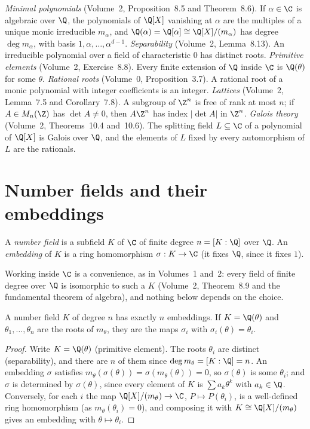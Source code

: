 \begin{reminder}
\emph{Minimal polynomials} (Volume~2, Proposition~8.5 and Theorem~8.6). If $\alpha\in\C$ is algebraic over $\Q$, the
polynomials of $\Q[X]$ vanishing at $\alpha$ are the multiples of a unique monic irreducible $m_\alpha$, and
$\Q(\alpha)=\Q[\alpha]\cong\Q[X]/(m_\alpha)$ has degree $\deg m_\alpha$, with basis $1,\alpha,\dots,\alpha^{d-1}$.
\emph{Separability} (Volume~2, Lemma~8.13). An irreducible polynomial over a field of characteristic $0$ has distinct
roots. \emph{Primitive elements} (Volume~2, Exercise~8.8). Every finite extension of $\Q$ inside $\C$ is $\Q(\theta)$
for some $\theta$. \emph{Rational roots} (Volume~0, Proposition~3.7). A rational root of a monic polynomial with
integer coefficients is an integer. \emph{Lattices} (Volume~2, Lemma~7.5 and Corollary~7.8). A subgroup of $\Z^n$ is free
of rank at most $n$; if $A\in M_n(\Z)$ has $\det A\ne0$, then $A\Z^n$ has index $|\det A|$ in $\Z^n$. \emph{Galois
theory} (Volume~2, Theorems~10.4 and~10.6). The splitting field $L\subseteq\C$ of a polynomial of $\Q[X]$ is Galois over
$\Q$, and the elements of $L$ fixed by every automorphism of $L$ are the rationals.
\end{reminder}

\section{Number fields and their embeddings}

\begin{definition}
A \emph{number field} is a subfield $K$ of $\C$ of finite degree $n=[K:\Q]$ over $\Q$. An \emph{embedding} of $K$ is
a ring homomorphism $\sigma:K\to\C$ (it fixes $\Q$, since it fixes $1$).
\end{definition}

Working inside $\C$ is a convenience, as in Volumes~1 and~2: every field of finite degree over $\Q$ is isomorphic to
such a $K$ (Volume~2, Theorem~8.9 and the fundamental theorem of algebra), and nothing below depends on the choice.

\begin{proposition}\label{prop:embeddings}
A number field $K$ of degree $n$ has exactly $n$ embeddings. If $K=\Q(\theta)$ and $\theta_1,\dots,\theta_n$ are the
roots of $m_\theta$, they are the maps $\sigma_i$ with $\sigma_i(\theta)=\theta_i$.
\end{proposition}
\begin{proof}
Write $K=\Q(\theta)$ (primitive element). The roots $\theta_i$ are distinct (separability), and there are $n$ of them
since $\deg m_\theta=[K:\Q]=n$. An embedding $\sigma$ satisfies $m_\theta(\sigma(\theta))=\sigma(m_\theta(\theta))=0$,
so $\sigma(\theta)$ is some $\theta_i$; and $\sigma$ is determined by $\sigma(\theta)$, since every element of $K$ is
$\sum a_k\theta^k$ with $a_k\in\Q$. Conversely, for each $i$ the map
$\Q[X]/(m_\theta)\to\C$, $P\mapsto P(\theta_i)$, is a well-defined ring homomorphism (as $m_\theta(\theta_i)=0$), and
composing it with $K\cong\Q[X]/(m_\theta)$ gives an embedding with $\theta\mapsto\theta_i$.
\end{proof}

